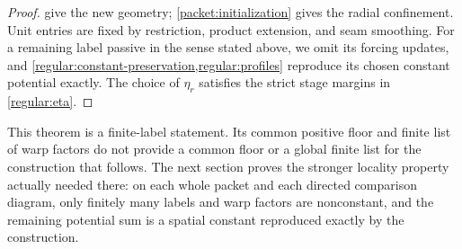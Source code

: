 \begin{proof}
 give the
new geometry; \cref{packet:initialization} gives the radial confinement.
Unit entries are fixed by restriction, product extension, and seam
smoothing. For a remaining label passive in the sense stated above,
we omit its forcing updates, and
\cref{regular:constant-preservation,regular:profiles} reproduce its chosen
constant potential exactly. The choice of $\eta_r$ satisfies the strict
stage margins in \eqref{regular:eta}.
\end{proof}

This theorem is a finite-label statement. Its common positive floor and finite
list of warp factors do not provide a common floor or a global finite
list for the construction that follows. The next section proves the
stronger locality property actually needed there: on each whole packet
and each directed comparison diagram, only finitely many labels and warp
factors are nonconstant, and the remaining potential sum is a spatial
constant reproduced exactly by the construction.
